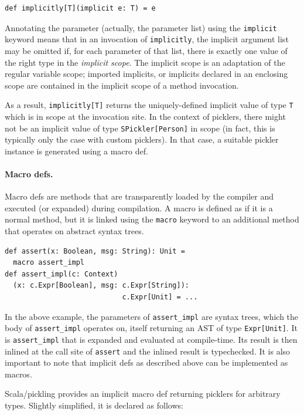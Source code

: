 \documentclass[10pt]{sigplanconf}
\theoremstyle{definition}
\theoremstyle{definition}
\begin{document}
\begin{lstlisting}
def implicitly[T](implicit e: T) = e
\end{lstlisting}
\noindent
Annotating the parameter (actually, the parameter list) using the
\verb|implicit| keyword means that in an invocation of \verb|implicitly|, the
implicit argument list may be omitted if, for each parameter of that list,
there is exactly one value of the right type in the {\em implicit scope}. The
implicit scope is an adaptation of the regular variable scope; imported
implicits, or implicits declared in an enclosing scope are contained in the
implicit scope of a method invocation.

As a result, \verb|implicitly[T]| returns the uniquely-defined implicit value
of type \verb|T| which is in scope at the invocation site. In the context of
picklers, there might not be an implicit value of type \verb|SPickler[Person]|
in scope (in fact, this is typically only the case with custom picklers). In
that case, a suitable pickler instance is generated using a macro def.

\paragraph{Macro defs.} Macro defs are methods that are transparently loaded
by the compiler and executed (or expanded) during compilation. A macro is
defined as if it is a normal method, but it is linked using the \verb|macro|
keyword to an additional method that operates on abstract syntax trees.

\begin{lstlisting}
def assert(x: Boolean, msg: String): Unit =
  macro assert_impl
def assert_impl(c: Context)
  (x: c.Expr[Boolean], msg: c.Expr[String]):
                            c.Expr[Unit] = ...
\end{lstlisting}

In the above example, the parameters of \verb|assert_impl| are syntax trees,
which the body of \verb|assert_impl| operates on, itself returning an AST
of type \verb|Expr[Unit]|. It is \verb|assert_impl| that is expanded and
evaluated at compile-time. Its result is then inlined at the call site of
\verb|assert| and the inlined result is typechecked. It is also important to
note that implicit defs as described above can be implemented as macros.

Scala/pickling provides an implicit macro def returning picklers for arbitrary
types. Slightly simplified, it is declared as follows:
\end{document}
